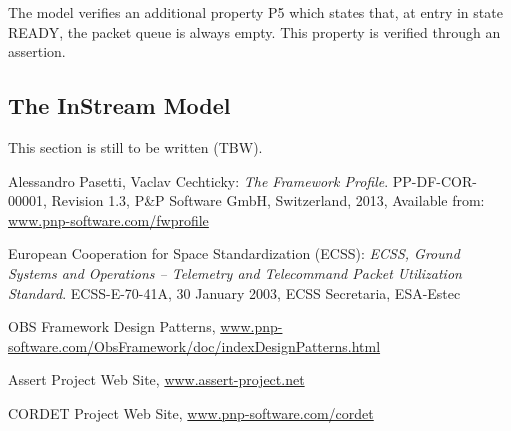 \documentclass[a4paper,10pt]{article}
\begin{document}
The model verifies an additional property P5 which states that, at entry in state READY, the packet queue is always empty. This property is verified through an assertion.

\lstset{belowskip=-1pt}	%


\subsection{The InStream Model}\label{sec:InStreamModel}
This section is still to be written (TBW).

\newpage

\begin{thebibliography}{6}

 Alessandro Pasetti, Vaclav Cechticky:
           {\sl The Framework Profile}. PP-DF-COR-00001, Revision 1.3,
           P\&P Software GmbH, Switzerland, 2013, 
           Available from: \url{www.pnp-software.com/fwprofile}

 European Cooperation for Space Standardization (ECSS):
           {\sl ECSS, Ground Systems and Operations – Telemetry and Telecommand Packet Utilization Standard}. 
           ECSS-E-70-41A, 30 January 2003,
           ECSS Secretaria, ESA-Estec 

 OBS Framework Design Patterns, \url{www.pnp-software.com/ObsFramework/doc/indexDesignPatterns.html}

 Assert Project Web Site, \url{www.assert-project.net}

 CORDET Project Web Site, \url{www.pnp-software.com/cordet}

\end{thebibliography}
\end{document}
